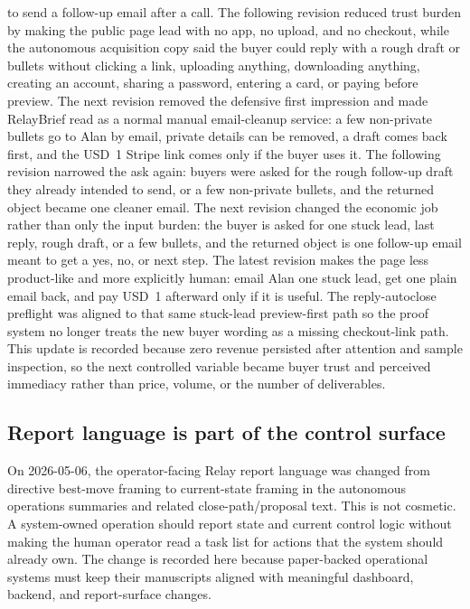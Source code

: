 \documentclass[12pt,letterpaper]{article}
\begin{document}
to send a follow-up email after a call. The following revision reduced trust burden by making the public page lead with no app, no upload, and no checkout, while the autonomous acquisition copy said the buyer could reply with a rough draft or bullets without clicking a link, uploading anything, downloading anything, creating an account, sharing a password, entering a card, or paying before preview. The next revision removed the defensive first impression and made RelayBrief read as a normal manual email-cleanup service: a few non-private bullets go to Alan by email, private details can be removed, a draft comes back first, and the USD~1 Stripe link comes only if the buyer uses it. The following revision narrowed the ask again: buyers were asked for the rough follow-up draft they already intended to send, or a few non-private bullets, and the returned object became one cleaner email. The next revision changed the economic job rather than only the input burden: the buyer is asked for one stuck lead, last reply, rough draft, or a few bullets, and the returned object is one follow-up email meant to get a yes, no, or next step. The latest revision makes the page less product-like and more explicitly human: email Alan one stuck lead, get one plain email back, and pay USD~1 afterward only if it is useful. The reply-autoclose preflight was aligned to that same stuck-lead preview-first path so the proof system no longer treats the new buyer wording as a missing checkout-link path. This update is recorded because zero revenue persisted after attention and sample inspection, so the next controlled variable became buyer trust and perceived immediacy rather than price, volume, or the number of deliverables.

\subsection{Report language is part of the control surface}

On 2026-05-06, the operator-facing Relay report language was changed from directive best-move framing to current-state framing in the autonomous operations summaries and related close-path/proposal text. This is not cosmetic. A system-owned operation should report state and current control logic without making the human operator read a task list for actions that the system should already own. The change is recorded here because paper-backed operational systems must keep their manuscripts aligned with meaningful dashboard, backend, and report-surface changes.
\end{document}
